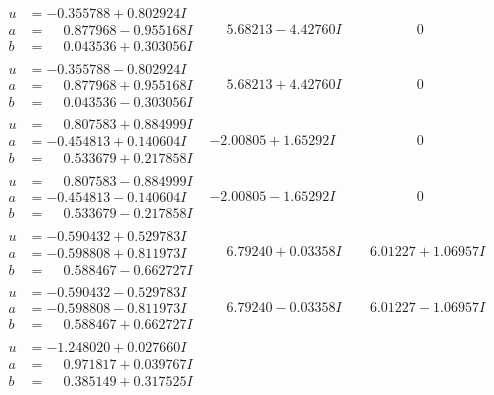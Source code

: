 \documentclass[1p]{elsarticle_modified}
\theoremstyle{definition}
\begin{document}
$$\begin{array}{c|c|c}
\begin{aligned}
u &= -0.355788 + 0.802924 I \\
a &= \phantom{-}0.877968 - 0.955168 I \\
b &= \phantom{-}0.043536 + 0.303056 I\end{aligned}
 & \phantom{-}5.68213 - 4.42760 I & \phantom{-0.000000 } 0 \\ \hline\begin{aligned}
u &= -0.355788 - 0.802924 I \\
a &= \phantom{-}0.877968 + 0.955168 I \\
b &= \phantom{-}0.043536 - 0.303056 I\end{aligned}
 & \phantom{-}5.68213 + 4.42760 I & \phantom{-0.000000 } 0 \\ \hline\begin{aligned}
u &= \phantom{-}0.807583 + 0.884999 I \\
a &= -0.454813 + 0.140604 I \\
b &= \phantom{-}0.533679 + 0.217858 I\end{aligned}
 & -2.00805 + 1.65292 I & \phantom{-0.000000 } 0 \\ \hline\begin{aligned}
u &= \phantom{-}0.807583 - 0.884999 I \\
a &= -0.454813 - 0.140604 I \\
b &= \phantom{-}0.533679 - 0.217858 I\end{aligned}
 & -2.00805 - 1.65292 I & \phantom{-0.000000 } 0 \\ \hline\begin{aligned}
u &= -0.590432 + 0.529783 I \\
a &= -0.598808 + 0.811973 I \\
b &= \phantom{-}0.588467 - 0.662727 I\end{aligned}
 & \phantom{-}6.79240 + 0.03358 I & \phantom{-}6.01227 + 1.06957 I \\ \hline\begin{aligned}
u &= -0.590432 - 0.529783 I \\
a &= -0.598808 - 0.811973 I \\
b &= \phantom{-}0.588467 + 0.662727 I\end{aligned}
 & \phantom{-}6.79240 - 0.03358 I & \phantom{-}6.01227 - 1.06957 I \\ \hline\begin{aligned}
u &= -1.248020 + 0.027660 I \\
a &= \phantom{-}0.971817 + 0.039767 I \\
b &= \phantom{-}0.385149 + 0.317525 I\end{aligned}

\end{array}$$
\end{document}

